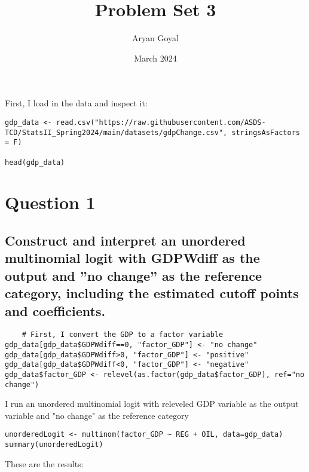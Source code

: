 \documentclass{article}
\title{Problem Set 3}
\author{Aryan Goyal}
\date{March 2024}
\begin{document}
\maketitle

First, I load in the data and inspect it:

\begin{verbatim}
gdp_data <- read.csv("https://raw.githubusercontent.com/ASDS-
TCD/StatsII_Spring2024/main/datasets/gdpChange.csv", stringsAsFactors = F)

head(gdp_data)
\end{verbatim}

\section{Question 1}
\subsection{Construct and interpret an unordered multinomial logit with GDPWdiff as the output
and ”no change” as the reference category, including the estimated cutoff 
points and coefficients.}
\begin{verbatim}
    # First, I convert the GDP to a factor variable
gdp_data[gdp_data$GDPWdiff==0, "factor_GDP"] <- "no change"
gdp_data[gdp_data$GDPWdiff>0, "factor_GDP"] <- "positive"
gdp_data[gdp_data$GDPWdiff<0, "factor_GDP"] <- "negative"
gdp_data$factor_GDP <- relevel(as.factor(gdp_data$factor_GDP), ref="no change")
\end{verbatim}
I run an unordered multinomial logit with releveled GDP variable as the output variable and "no change" as the reference category
\begin{verbatim}
unorderedLogit <- multinom(factor_GDP ~ REG + OIL, data=gdp_data)
summary(unorderedLogit)
\end{verbatim}
These are the results:
\\
\end{document}
